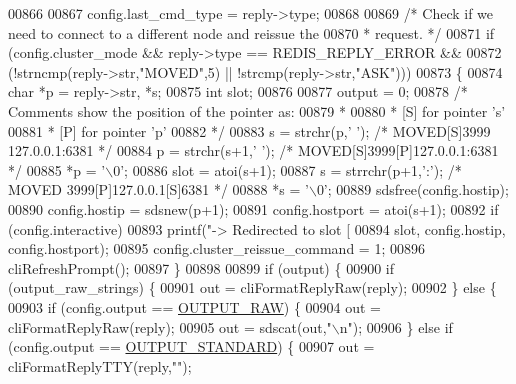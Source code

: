 \begin{DoxyCode}
{{{{{{{{{{{{{{{{{{{{{{{{{{00866 
00867     config.last\_cmd\_type = reply->type;
00868 
00869     \textcolor{comment}{/* Check if we need to connect to a different node and reissue the}
00870 \textcolor{comment}{     * request. */}
00871     \textcolor{keywordflow}{if} (config.cluster\_mode && reply->type == REDIS\_REPLY\_ERROR &&
00872         (!strncmp(reply->str,\textcolor{stringliteral}{"MOVED"},5) || !strcmp(reply->str,\textcolor{stringliteral}{"ASK"})))
00873     \{
00874         \textcolor{keywordtype}{char} *p = reply->str, *s;
00875         \textcolor{keywordtype}{int} slot;
00876 
00877         output = 0;
00878         \textcolor{comment}{/* Comments show the position of the pointer as:}
00879 \textcolor{comment}{         *}
00880 \textcolor{comment}{         * [S] for pointer 's'}
00881 \textcolor{comment}{         * [P] for pointer 'p'}
00882 \textcolor{comment}{         */}
00883         s = strchr(p,\textcolor{stringliteral}{' '});      \textcolor{comment}{/* MOVED[S]3999 127.0.0.1:6381 */}
00884         p = strchr(s+1,\textcolor{stringliteral}{' '});    \textcolor{comment}{/* MOVED[S]3999[P]127.0.0.1:6381 */}
00885         *p = \textcolor{stringliteral}{'\(\backslash\)0'};
00886         slot = atoi(s+1);
00887         s = strrchr(p+1,\textcolor{stringliteral}{':'});    \textcolor{comment}{/* MOVED 3999[P]127.0.0.1[S]6381 */}
00888         *s = \textcolor{stringliteral}{'\(\backslash\)0'};
00889         sdsfree(config.hostip);
00890         config.hostip = sdsnew(p+1);
00891         config.hostport = atoi(s+1);
00892         \textcolor{keywordflow}{if} (config.interactive)
00893             printf(\textcolor{stringliteral}{"-> Redirected to slot [%
00894                 slot, config.hostip, config.hostport);
00895         config.cluster\_reissue\_command = 1;
00896         cliRefreshPrompt();
00897     \}
00898 
00899     \textcolor{keywordflow}{if} (output) \{
00900         \textcolor{keywordflow}{if} (output\_raw\_strings) \{
00901             out = cliFormatReplyRaw(reply);
00902         \} \textcolor{keywordflow}{else} \{
00903             \textcolor{keywordflow}{if} (config.output == \hyperlink{redis-cli_8c_a4f47017b54da140967dcbd440fae227c}{OUTPUT\_RAW}) \{
00904                 out = cliFormatReplyRaw(reply);
00905                 out = sdscat(out,\textcolor{stringliteral}{"\(\backslash\)n"});
00906             \} \textcolor{keywordflow}{else} \textcolor{keywordflow}{if} (config.output == \hyperlink{redis-cli_8c_abf624f04f4590979c3c3944bc7f94d6e}{OUTPUT\_STANDARD}) \{
00907                 out = cliFormatReplyTTY(reply,\textcolor{stringliteral}{""});
}}}}}}}}}}}}}}}}}}}}}}}}}}}
\end{DoxyCode}

